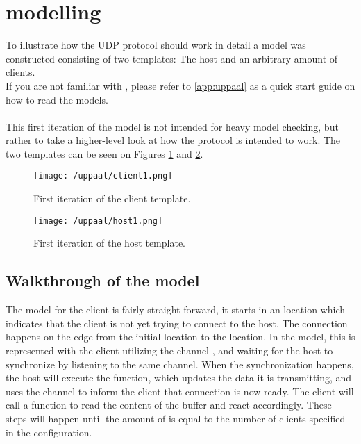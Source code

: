 \section{\uppaal modelling}\label{sec:sprint3-uppaal}
To illustrate how the UDP protocol should work in detail a \uppaal model was constructed consisting of two templates: The host and an arbitrary amount of clients.\\
If you are not familiar with \uppaal, please refer to \autoref{app:uppaal} as a quick start guide on how to read the models.\\\\
This first iteration of the model is not intended for heavy model checking, but rather to take a higher-level look at how the protocol is intended to work.
The two templates can be seen on Figures \ref{fig:uppaal-client-1} and \ref{fig:uppaal-host-1}.

\begin{figure}[H]
   \centering
    \texttt{[image: /uppaal/client1.png]}
    \caption{First iteration of the \uppaal client template.}
    \label{fig:uppaal-client-1}
\end{figure}

\begin{figure}[H]
   \centering
    \texttt{[image: /uppaal/host1.png]}
    \caption{First iteration of the \uppaal host template.}
    \label{fig:uppaal-host-1}
\end{figure}

\subsection{Walkthrough of the model}
The model for the client is fairly straight forward, it starts in an  location which indicates that the client is not yet trying to connect to the host.
The connection happens on the edge from the initial location to the  location.
In the model, this is represented with the client utilizing the channel , and waiting for the host to synchronize by listening to the same channel.
When the synchronization happens, the host will execute the  function, which updates the data it is transmitting, and uses the channel  to inform the client that connection is now ready.
The client will call a function  to read the content of the buffer and react accordingly. 
These steps will happen until the amount of  is equal to the number of clients specified in the configuration.

